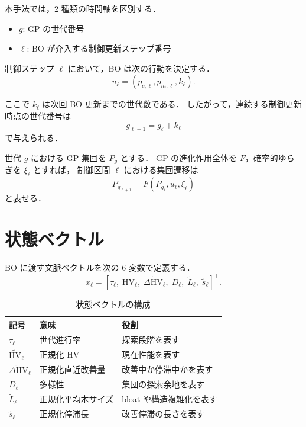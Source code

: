 \documentclass[a4paper,11pt]{ltjsarticle}
\newcommand{\HV}{\mathrm{HV}}
\begin{document}
本手法では，2 種類の時間軸を区別する．
\begin{itemize}[leftmargin=3em]
  \item \(g\): GP の世代番号
  \item \(\ell\): BO が介入する制御更新ステップ番号
\end{itemize}

制御ステップ \(\ell\) において，BO は次の行動を決定する．
\begin{equation}
u_\ell =
\left(
p_{c,\ell},
p_{m,\ell},
k_\ell
\right).
\end{equation}

ここで \(k_\ell\) は次回 BO 更新までの世代数である．
したがって，連続する制御更新時点の世代番号は
\begin{equation}
g_{\ell+1}=g_\ell+k_\ell
\end{equation}
で与えられる．

世代 \(g\) における GP 集団を \(P_g\) とする．
GP の進化作用全体を \(F\)，確率的ゆらぎを \(\xi_\ell\) とすれば，
制御区間 \(\ell\) における集団遷移は
\begin{equation}
P_{g_{\ell+1}}
=
F(P_{g_\ell},u_\ell,\xi_\ell)
\end{equation}
と表せる．

\section{状態ベクトル}

BO に渡す文脈ベクトルを次の 6 変数で定義する．
\begin{equation}
x_\ell =
\left[
\tau_\ell,\;
\widetilde{\HV}_\ell,\;
\widetilde{\Delta \HV}_\ell,\;
D_\ell,\;
\widetilde{L}_\ell,\;
\widetilde{s}_\ell
\right]^\top .
\end{equation}

\begin{table}[htbp]
\centering
\caption{状態ベクトルの構成}
\begin{tabular}{lll}
\toprule
記号 & 意味 & 役割 \\
\midrule
\(\tau_\ell\) & 世代進行率 & 探索段階を表す \\
\(\widetilde{\HV}_\ell\) & 正規化 HV & 現在性能を表す \\
\(\widetilde{\Delta \HV}_\ell\) & 正規化直近改善量 & 改善中か停滞中かを表す \\
\(D_\ell\) & 多様性 & 集団の探索余地を表す \\
\(\widetilde{L}_\ell\) & 正規化平均木サイズ & bloat や構造複雑化を表す \\
\(\widetilde{s}_\ell\) & 正規化停滞長 & 改善停滞の長さを表す \\
\bottomrule
\end{tabular}
\end{table}
\end{document}
